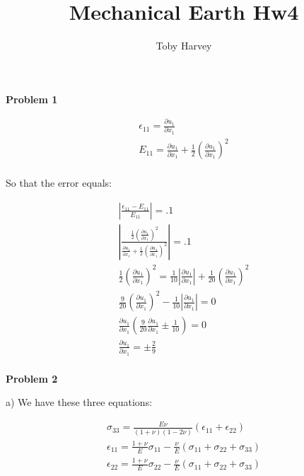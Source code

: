 \documentclass{article}
\begin{document}
\title{Mechanical Earth Hw4}
\author{Toby Harvey}
\maketitle

\noindent\textbf{Problem 1}

\begin{gather*}
  \epsilon_{11} = \frac{\partial u_1}{\partial x_1}\\
  E_{11} = \frac{\partial u_1}{\partial x_1} +\frac{1}{2} \left(\frac{\partial u_1}{\partial x_1}\right)^2\\
\end{gather*}

So that the error equals:

\begin{gather*}
  \left|\frac{\epsilon_{11} - E_{11}}{E_{11}}\right| = .1\\
  \left|\frac{\frac{1}{2}\left(\frac{\partial u_1}{\partial x_1}\right)^2}{ \frac{\partial u_1}{\partial x_1} + \frac{1}{2}\left(\frac{\partial u_1}{\partial x_1}\right)^2}\right| = .1\\
  \frac{1}{2}\left(\frac{\partial u_1}{\partial x_1}\right)^2 = \frac{1}{10}\left|\frac{\partial u_1}{\partial x_1}\right| + \frac{1}{20}\left(\frac{\partial u_1}{\partial x_1}\right)^2\\
  \frac{9}{20}\left(\frac{\partial u_1}{\partial x_1}\right)^2 -  \frac{1}{10}\left|\frac{\partial u_1}{\partial x_1}\right| = 0\\
  \frac{\partial u_1}{\partial x_1} \left(\frac{9}{20}\frac{\partial u_1}{\partial x_1} \pm \frac{1}{10}\right) = 0\\
  \frac{\partial u_1}{\partial x_1} = \pm \frac{2}{9}\\
\end{gather*}

\newpage


\noindent\textbf{Problem 2}


\noindent a) We have these three equations:

\begin{gather}
  \sigma_{33} = \frac{E\nu}{(1+\nu)(1-2\nu)}(\epsilon_{11} + \epsilon_{22})\\
  \epsilon_{11} = \frac{1+\nu}{E}\sigma_{11} - \frac{\nu}{E}(\sigma_{11} + \sigma_{22} + \sigma_{33})\\
  \epsilon_{22} = \frac{1+\nu}{E}\sigma_{22} - \frac{\nu}{E}(\sigma_{11} + \sigma_{22} + \sigma_{33})
\end{gather}
\end{document}
